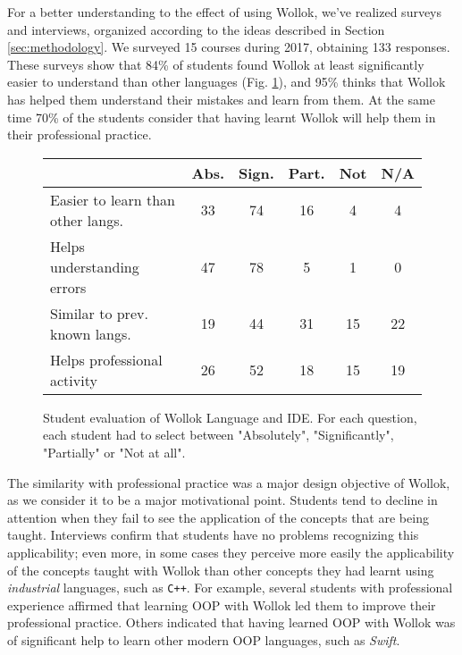 \medskip
For a better understanding to the effect of using Wollok, we've realized surveys and interviews, organized according to the ideas described in Section \ref{sec:methodology}.
We surveyed 15 courses during 2017, obtaining 133 responses.
These surveys show that 84\% of students found Wollok at least significantly easier to understand than other languages (\cf Fig. \ref{fig:surveys/languageAppreciation}),
and 95\% thinks that Wollok has helped them understand their mistakes and learn from them.
At the same time 70\% of the students consider that having learnt Wollok will help them in their professional practice.

\begin{figure}[ht]
 \centering
 \footnotesize
 \begin{tabular}{|p{13em}|c|c|c|c|c|}
 	\hline
 	& Abs. & Sign. & Part. & Not & N/A \\
 	\hline
 	Easier to learn than other langs. & 33 & 74 & 16 & 4 & 4 \\
 	Helps understanding errors & 47 & 78 & 5 & 1 & 0 \\
 	Similar to prev. known langs. & 19 & 44 & 31 & 15 & 22 \\
 	Helps professional activity & 26 & 52 & 18 & 15 & 19 \\
 	\hline
 
 \end{tabular}

 \caption{\small Student evaluation of Wollok Language and IDE. 
 For each question, each student had to select between "Absolutely", "Significantly", "Partially" or "Not at all".}
\label{fig:surveys/languageAppreciation}
\end{figure}

The similarity with professional practice was a major design objective of Wollok, 
as we consider it to be a major motivational point.
Students tend to decline in attention 
when they fail to see the application of the concepts that are being taught.
Interviews confirm that students have no problems recognizing this applicability;
even more, in some cases they perceive more easily the applicability of the concepts taught with Wollok 
than other concepts they had learnt using \emph{industrial} languages, such as \texttt{C++}.
For example, several students with professional experience affirmed that 
learning OOP with Wollok led them to improve their professional practice.
Others indicated that having learned OOP with Wollok was of significant help 
to learn other modern OOP languages, such as \emph{Swift}.

